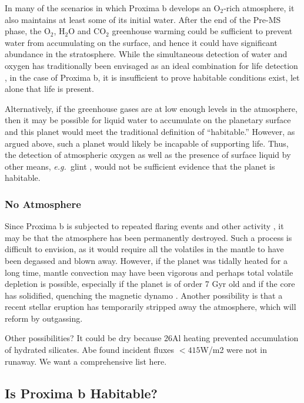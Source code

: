 \documentclass[preprint,12pt]{aastex}
\newcommand{\xxx}[1]{{\color{red} #1}} %
\def\eg{{\it e.g.\ }}
\begin{document}
In many of the scenarios in which Proxima b develops an O$_2$-rich atmosphere,
it also maintains at least some of its initial water.
After the end of the Pre-MS phase, the O$_2$, H$_2$O and CO$_2$
greenhouse warming could be sufficient to prevent water from
accumulating on the surface, and hence it could have significant
abundance in the stratosphere. While the simultaneous detection of
water and oxygen has traditionally been envisaged as an ideal
combination for life detection \citep{DesMarais2002}, in the case of Proxima b, it is
insufficient to prove habitable conditions exist, let alone that life
is present.

Alternatively, if the greenhouse gases are at low enough levels in the atmosphere,
then it may be possible for liquid water to accumulate on the
planetary surface and this planet would meet the traditional
definition of ``habitable.'' However, as argued above, such a planet
would likely be incapable of supporting life.
Thus, the detection of atmospheric oxygen as well as the
presence of surface liquid by other means, \eg glint
\citep{Robinson10}, would not be sufficient evidence that the planet
is habitable.

\subsubsection{No Atmosphere}
\label{sec:results:atmstates:noatmos}

Since Proxima b is subjected to repeated flaring events and other
activity \citep{Walker81,Davenport16}, it may be that the
atmosphere has been permanently destroyed. Such a process is
difficult to envision, as it would require all the volatiles in the
mantle to have been degassed and blown away. However, if the planet
was tidally heated for a long time, mantle convection may have been
vigorous and perhaps total volatile depletion is possible, especially
if the planet is of order 7 Gyr old and if the core has solidified,
quenching the magnetic dynamo \citep{DriscollBarnes15}. 
Another possibility is that a recent
stellar eruption has temporarily stripped away the atmosphere, which
will reform by outgassing.

\xxx{Other possibilities? It could be dry because 26Al heating prevented accumulation of hydrated silicates. Abe found incident fluxes $< 415$W/m2 were not in runaway. We want a comprehensive list here.}


\subsection{Is Proxima b Habitable?}
\label{sec:results:habitable}
\end{document}

